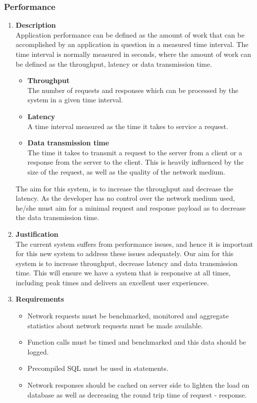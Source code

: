 \documentclass[a4paper,10pt]{article}
\begin{document}
\subsubsection{Performance}
\begin{enumerate}
\item \textbf{Description} \\
Application performance can be defined as the amount of work that can be accomplished by an application in question in a measured time interval. The time interval is normally measured in seconds, where the amount of work can be defined as the throughput, latency or data transmission time.
	\begin{itemize}
		\item \textbf{Throughput} \\
		The number of requests and responses which can be processed by the system in a given time interval.
		\item \textbf{Latency} \\
		A time interval measured as the time it takes to service a request. 
		\item \textbf{Data transmission time} \\
		The time it takes to transmit a request to the server from a client or a response from the server to the client. This is heavily influenced by the size of the request, as well as the quality of the network medium.
	\end{itemize}
	
	The aim for this system, is to increase the throughput and decrease the latency. As the developer has no control over the network medium used, he/she must aim for a minimal request and response payload as to decrease the data transmission time.
\item \textbf{Justification} \\
The current system suffers from performance issues, and hence it is important for this new system to address these issues adequately. Our aim for this system is to increase throughput, decrease latency and data transmission time. This will ensure we have a system that is responsive at all times, including peak times and delivers an excellent user experiencee.
\item \textbf{Requirements}
	\begin{itemize}
		\item Network requests must be benchmarked, monitored and aggregate statistics about network requests must be made available.
		\item Function calls must be timed and benchmarked and this data should be logged.
		\item Precompiled SQL must be used in statements.
		\item Network responses should be cached on server side to lighten the load on database as well as decreasing the round trip time of request - response.
		\end{itemize}
\end{enumerate}
\end{document}
